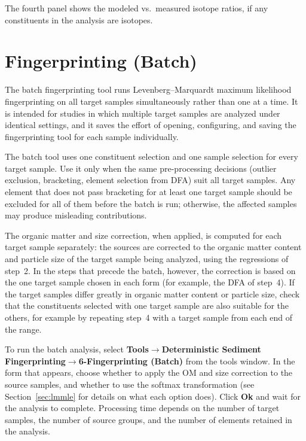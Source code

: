 \documentclass[12pt]{report}
\begin{document}
The fourth panel shows the modeled vs.\ measured isotope ratios, if any constituents in the analysis are isotopes.

\section{Fingerprinting (Batch)}\label{sec:fingerprinting-batch}
The batch fingerprinting tool runs Levenberg--Marquardt maximum likelihood fingerprinting on all target samples simultaneously rather than one at a time. It is intended for studies in which multiple target samples are analyzed under identical settings, and it saves the effort of opening, configuring, and saving the fingerprinting tool for each sample individually.

\begin{tcolorbox}[colback=yellow!10,colframe=yellow!50!black,title=Note]
The batch tool uses one constituent selection and one sample selection for every target sample. Use it only when the same pre-processing decisions (outlier exclusion, bracketing, element selection from DFA) suit all target samples. Any element that does not pass bracketing for at least one target sample should be excluded for all of them before the batch is run; otherwise, the affected samples may produce misleading contributions.

The organic matter and size correction, when applied, is computed for each target sample separately: the sources are corrected to the organic matter content and particle size of the target sample being analyzed, using the regressions of step~2. In the steps that precede the batch, however, the correction is based on the one target sample chosen in each form (for example, the DFA of step~4). If the target samples differ greatly in organic matter content or particle size, check that the constituents selected with one target sample are also suitable for the others, for example by repeating step~4 with a target sample from each end of the range.
\end{tcolorbox}

To run the batch analysis, select \textbf{Tools}$\rightarrow$\textbf{Deterministic Sediment Fingerprinting}$\rightarrow$\textbf{6-Fingerprinting (Batch)} from the tools window. In the form that appears, choose whether to apply the OM and size correction to the source samples, and whether to use the softmax transformation (see Section~\ref{sec:lmmle} for details on what each option does). Click \textbf{Ok} and wait for the analysis to complete. Processing time depends on the number of target samples, the number of source groups, and the number of elements retained in the analysis.
\end{document}
